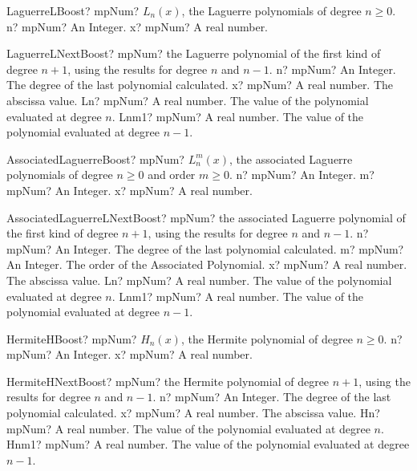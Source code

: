 \documentclass[12pt,a4paper,openany]{book}
\begin{document}
\begin{mpFunctionsExtract}
\mpFunctionTwo
{LaguerreLBoost? mpNum? $L_n (x)$, the Laguerre polynomials of degree $n \geq 0$.}
{n? mpNum? An Integer.}
{x? mpNum? A real number.}
\end{mpFunctionsExtract}

\begin{mpFunctionsExtract}
\mpFunctionFour
{LaguerreLNextBoost? mpNum? the Laguerre polynomial of the first kind of degree $n+1$, using the results for degree $n$ and $n-1$.}
{n? mpNum? An Integer. The degree of the last polynomial calculated.}
{x? mpNum? A real number. The abscissa value.}
{Ln? mpNum? A real number. The value of the polynomial evaluated at degree $n$.}
{Lnm1? mpNum? A real number. The value of the polynomial evaluated at degree $n-1$.}
\end{mpFunctionsExtract}

\begin{mpFunctionsExtract}
\mpFunctionThree
{AssociatedLaguerreBoost? mpNum? $L^m_n (x)$, the associated Laguerre polynomials of degree $n \geq 0$ and order $m \geq 0$.}
{n? mpNum? An Integer.}
{m? mpNum? An Integer.}
{x? mpNum? A real number.}
\end{mpFunctionsExtract}

\begin{mpFunctionsExtract}
\mpFunctionFive
{AssociatedLaguerreLNextBoost? mpNum? the associated Laguerre polynomial of the first kind of degree $n+1$, using the results for degree $n$ and $n-1$.}
{n? mpNum? An Integer. The degree of the last polynomial calculated.}
{m? mpNum? An Integer. The order of the Associated Polynomial.}
{x? mpNum? A real number. The abscissa value.}
{Ln? mpNum? A real number. The value of the polynomial evaluated at degree $n$.}
{Lnm1? mpNum? A real number. The value of the polynomial evaluated at degree $n-1$.}
\end{mpFunctionsExtract}

\begin{mpFunctionsExtract}
\mpFunctionTwo
{HermiteHBoost? mpNum? $H_n(x)$, the Hermite polynomial of degree $n \geq 0$.}
{n? mpNum? An Integer.}
{x? mpNum? A real number.}
\end{mpFunctionsExtract}

\begin{mpFunctionsExtract}
\mpFunctionFour
{HermiteHNextBoost? mpNum? the Hermite polynomial of degree $n+1$, using the results for degree $n$ and $n-1$.}
{n? mpNum? An Integer. The degree of the last polynomial calculated.}
{x? mpNum? A real number. The abscissa value.}
{Hn? mpNum? A real number. The value of the polynomial evaluated at degree $n$.}
{Hnm1? mpNum? A real number. The value of the polynomial evaluated at degree $n-1$.}
\end{mpFunctionsExtract}
\end{document}
